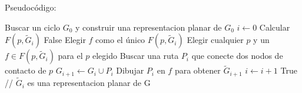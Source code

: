 Pseudocódigo:
\begin{algorithmic}[1]
    \State Buscar un ciclo $G_0$ y construir una representacion planar de $G_0$
    \State $i \gets 0$
            \State Calcular $F(p, \tilde G_ i)$
                \State \Return False
            \EndIf
        \EndFor
            \State Elegir $f$ como el único $F(p, \tilde G_ i)$
        \Else
            \State Elegir cualquier $p$ y un $f \in F(p, \tilde G_ i)$ para el $p$ elegido
        \EndIf
        \State Buscar una ruta $P_i$ que conecte dos nodos de contacto de $p$
        \State $G_{i+1} \gets G_i \cup P_i$
        \State Dibujar $P_i$ en $f$ para obtener $\tilde  G_{i+1}$
        \State $i \gets i+1$
    \EndWhile
    \State \Return True // $\tilde G_i$ es una representacion planar de G
\end{algorithmic}
